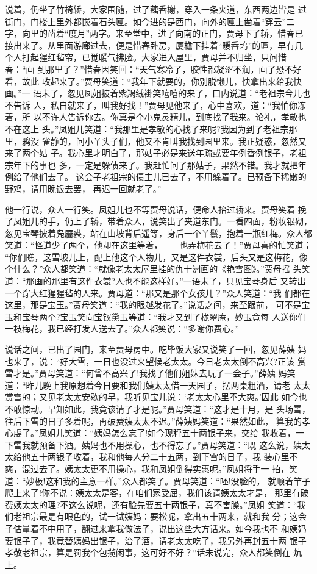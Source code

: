 说着，仍坐了竹椅轿，大家围随，过了藕香榭，穿入一条夹道，东西两边皆是
过街门，门楼上里外都嵌着石头匾。如今进的是西门，向外的匾上凿着“穿云”二
字，向里的凿着“度月”两字。来至堂中，进了向南的正门，贾母下了轿，惜春已
接出来了。从里面游廊过去，便是惜春卧房，厦檐下挂着“暖香坞”的匾，早有几
个人打起猩红毡帘，已觉暖气拂脸。大家进入屋里，贾母并不归坐，只问惜春：“画
到那里了？”惜春因笑回：“天气寒冷了，胶性都凝涩不润，画了恐不好看，故此
收起来了。”贾母笑道：“我年下就要的，你别脱懒儿，快拿出来给我快画。”一
语未了，忽见凤姐披着紫羯绒褂笑嘻嘻的来了，口内说道：“老祖宗今儿也不告诉
人，私自就来了，叫我好找！”贾母见他来了，心中喜欢，道：“我怕你冻着，所
以不许人告诉你去。你真是个小鬼灵精儿，到底找了我来。论礼，孝敬也不在这上
头。”凤姐儿笑道：“我那里是孝敬的心找了来呢?我因为到了老祖宗那里，鸦没
雀静的，问小丫头子们，他又不肯叫我找到园里来。我正疑惑，忽然又来了两个姑
子。我心里才明白了，那姑子必是来送年疏或要年例香例银子，老祖宗年下的事也
多，一定是躲债来了。我赶忙问了那姑子，果然不错。我才就把年例给了他们去了。
这会子老祖宗的债主儿已去了，不用躲着了。已预备下稀嫩的野鸡，请用晚饭去罢，
再迟一回就老了。”

他一行说，众人一行笑。凤姐儿也不等贾母说话，便命人抬过轿来。贾母笑着
挽了凤姐儿的手，仍上了轿，带着众人，说笑出了夹道东门。一看四面，粉妆银砌，
忽见宝琴披着凫靥裘，站在山坡背后遥等，身后一个丫鬟，抱着一瓶红梅。众人都
笑道：“怪道少了两个，他却在这里等着，——也弄梅花去了！”贾母喜的忙笑道；
“你们瞧，这雪坡儿上，配上他这个人物儿，又是这件衣裳，后头又是这梅花，像
个什么？”众人都笑道：“就像老太太屋里挂的仇十洲画的《艳雪图》。”贾母摇
头笑道：“那画的那里有这件衣裳?人也不能这样好。”一语未了，只见宝琴身后
又转出一个穿大红猩猩毡的人来。贾母道：“那又是那个女孩儿？”众人笑道：“我
们都在这里，那是宝玉。”贾母笑道：“我的眼越发花了。”说话之间，来至跟前，
可不是宝玉和宝琴两个?宝玉笑向宝钗黛玉等道：“我才又到了栊翠庵，妙玉竟每
人送你们一枝梅花，我已经打发人送去了。”众人都笑说：“多谢你费心。”

说话之间，已出了园门，来至贾母房中。吃毕饭大家又说笑了一回，忽见薛姨
妈也来了，说：“好大雪，一日也没过来望候老太太。今日老太太倒不高兴?正该
赏雪才是。”贾母笑道：“何曾不高兴了!我找了他们姐妹去玩了一会子。”薛姨
妈笑道：“昨儿晚上我原想着今日要和我们姨太太借一天园子，摆两桌粗酒，请老
太太赏雪的；又见老太太安歇的早，我听见宝儿说：‘老太太心里不大爽。’因此
如今也不敢惊动。早知如此，我竟该请了才是呢。”贾母笑道：“这才是十月，是
头场雪，往后下雪的日子多着呢，再破费姨太太不迟。”薛姨妈笑道：“果然如此，
算我的孝心虔了。”凤姐儿笑道：“姨妈怎么忘了!如今现秤五十两银子来，交给
我收着，一下雪我就预备下酒。姨妈也不用操心，也不得忘了。”贾母笑道：“既
这么说，姨太太给他五十两银子收着，我和他每人分二十五两，到下雪的日子，我
装心里不爽，混过去了。姨太太更不用操心，我和凤姐倒得实惠呢。”凤姐将手一
拍，笑道：“妙极!这和我的主意一样。”众人都笑了。贾母笑道：“呸!没脸的，
就顺着竿子爬上来了!你不说：姨太太是客，在咱们家受屈，我们该请姨太太才是，
那里有破费姨太太的理?不这么说呢，还有脸先要五十两银子，真不害臊。”凤姐
笑道：“我们老祖宗最是有眼色的，试一试姨妈：要松呢，拿出五十两来，就和我
分；这会子估量着不中用了，翻过来拿我做法子，说出这些大方话来。如今我也不
和姨妈要银子了，我竟替姨妈出银子，治了酒，请老太太吃了，我另外再封五十两
银子孝敬老祖宗，算是罚我个包揽闲事，这可好不好？”话未说完，众人都笑倒在
炕上。


